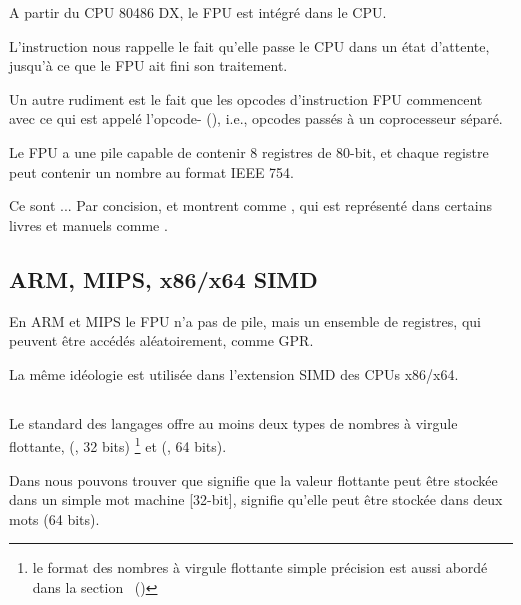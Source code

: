 A partir du CPU 80486 DX, le \ac{FPU} est intégré dans le \ac{CPU}.

L'instruction  nous rappelle le fait qu'elle passe le \ac{CPU} dans un
état d'attente, jusqu'à ce que le \ac{FPU} ait fini son traitement.

Un autre rudiment est le fait que les opcodes d'instruction \ac{FPU} commencent
avec ce qui est appelé l'opcode- (), i.e., opcodes
passés à un coprocesseur séparé.

\label{FPU_is_stack}

Le FPU a une pile capable de contenir 8 registres de 80-bit, et chaque registre peut
contenir un nombre au format IEEE 754\FNURLIEEE.

Ce sont ... Par concision, \IDA et \olly montrent  comme ,
qui est représenté dans certains livres et manuels comme .

\subsection{ARM, MIPS, x86/x64 SIMD}

En ARM et MIPS le FPU n'a pas de pile, mais un ensemble de registres, qui peuvent
être accédés aléatoirement, comme \ac{GPR}.

La même idéologie est utilisée dans l'extension SIMD des CPUs x86/x64.

\subsection{\CCpp}


Le standard des langages \CCpp offre au moins deux types de nombres à virgule flottante,
\Tfloat (\FNURLSP, 32 bits) \footnote{le format des nombres
à virgule flottante simple précision est aussi abordé dans la section \IT{\WorkingWithFloatAsWithStructSubSubSectionName}~()}
et \Tdouble  (\FNURLDP, 64 bits).

Dans  nous pouvons trouver que 
signifie que la valeur flottante peut être stockée dans un simple mot machine [32-bit],
 signifie qu'elle peut être stockée dans deux mots (64 bits).


